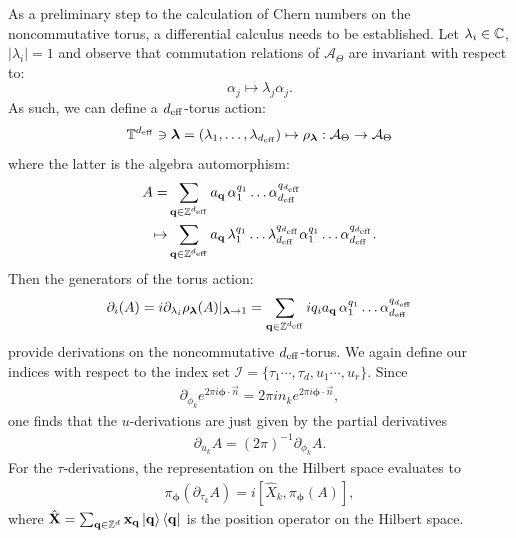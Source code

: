 \documentclass[
    10pt,
    aps,
    prb,
	longbibliography,
    twocolumn,
    floatfix,
    superscriptaddress,
]{revtex4-2}
\begin{document}
As a preliminary step to the calculation of Chern numbers on the noncommutative torus, a differential calculus needs to be established.
Let $\lambda_i \in {\mathbb C}$, $|\lambda_i| =1$ and observe that commutation relations of $\mathcal{A}_\Theta$ are invariant with respect to:
\begin{equation}
\alpha_j \mapsto \lambda_j \alpha_j.
\end{equation}
As such, we can define a ${d_\mathrm{eff}}$-torus action:
\begin{equation}
{\mathbb T}^{d_\mathrm{eff}} \ni \bm \lambda=(\lambda_1,\ldots,\lambda_{d_\mathrm{eff}}) \mapsto \rho_{\bm \lambda}: \mathcal{A}_\Theta \to \mathcal{A}_\Theta
\end{equation}
where the latter is the algebra automorphism:
\begin{align}
	A =& \sum_{\mathbf{q} \in {\mathbb Z}^{{d_\mathrm{eff}}}} a_{\mathbf{q}}
	\, \alpha_1^{q_1} \ldots\alpha_{d_\mathrm{eff}}^{q_{d_\mathrm{eff}}}
    \notag \\
 \mapsto & 
	\sum_{\mathbf{q} \in {\mathbb Z}^{{d_\mathrm{eff}}}} a_{\mathbf{q}}
	\, 
	\lambda_1^{q_1} \ldots\lambda_{d_\mathrm{eff}}^{q_{d_\mathrm{eff}}}
	\alpha_1^{q_1} \ldots\alpha_{d_\mathrm{eff}}^{q_{d_\mathrm{eff}}} .
\end{align}
Then the generators of the torus action:
\begin{equation}
\partial_i(A) = i \partial_{\lambda_i} \rho_{\bm \lambda}(A)|_{\bm \lambda \rightarrow 1}
=\sum_{\mathbf{q} \in {\mathbb Z}^{{d_\mathrm{eff}}}} i q_i a_{\mathbf{q}}
\, \alpha_1^{q_1} \ldots\alpha_{d_\mathrm{eff}}^{q_{d_\mathrm{eff}}}
\end{equation}
provide derivations on the noncommutative ${d_\mathrm{eff}}$-torus. 
We again define our indices with respect to the index set $\mathcal{I} = \lbrace \tau_1 \cdots, \tau_d, u_1  \cdots, u_r  \rbrace$.
Since
\begin{align}
	\partial_{\phi_k}  e^{2\pi i \boldsymbol{\phi} \cdot \vec{n}} = 2\pi  i n_k  e^{2 \pi i \boldsymbol{\phi} \cdot \vec{n}},
\end{align}
one finds that the $u$-derivations are just given by the partial derivatives
\begin{align}
	\partial_{u_k}  A 
	=  (2\pi)^{-1}\partial_{\phi_k}  A. 
\end{align}
For the $\tau$-derivations, the representation on the Hilbert space evaluates to
\begin{align}
	\pi_{\boldsymbol{\phi}} (\partial_{\tau_k} A) = i [ \hat{X}_k, \pi_{\boldsymbol{\phi}} (A)],
\end{align}
where $\hat{\mathbf{X}} = \sum_{\mathbf{q}\in \mathbb{Z}^d} \mathbf{x}_{\mathbf{q}}\ket{\mathbf{q}} \bra{\mathbf{q}}$ is the position operator on the Hilbert space.
\end{document}
